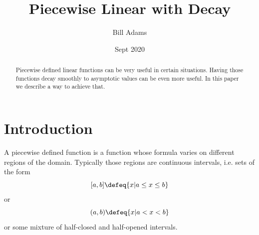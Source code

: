 \documentclass[10pt]{article}
\title{Piecewise Linear with Decay}
\author{Bill Adams}
\date{Sept 2020}
\begin{document}
\maketitle

\begin{abstract}
	Piecewise defined linear functions can be very useful in certain situations.  Having those
	functions decay smoothly to asymptotic values can be even more useful.  In this paper we
	describe a way to achieve that.
\end{abstract}

\tableofcontents

\section{Introduction}
A piecewise defined function is a function whose formula varies on different
regions of the domain. Typically those regions are continuous intervals, i.e.
sets of the form
$$[a,b] \defeq \{x | a \leq x \leq b\}$$
or
$$(a,b) \defeq \{x | a < x < b\}$$
or some mixture of half-closed and half-opened intervals.
\end{document}
